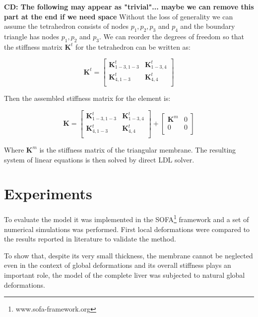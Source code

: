 \documentclass{llncs}
\newcommand{\CD}[1]{{\color{green}\textbf{CD: #1}}}
\newcommand{\Mat}[1]{\mathbf{#1}}
\begin{document}
\CD{The following may appear as "trivial"... maybe we can remove this part at the end if we need space} 
Without the loss of generality we can assume the tetrahedron consists of
nodes $p_1, p_2, p_3$ and $p_4$ and the boundary triangle has nodes $p_1, p_2$
and $p_3$. We can reorder the degrees of freedom so that the stiffness
matrix $\Mat{K}^t$ for the tetrahedron can be written as:

\begin{equation}
  \Mat{K}^t = \left[\begin{array}{c|c}
      \Mat{K}^t_{1-3,1-3} & \Mat{K}^t_{1-3,4} \\
      \hline
      \Mat{K}^t_{4,1-3} & \Mat{K}^t_{4,4} \\
  \end{array}\right]
\end{equation}

Then the assembled stiffness matrix for the element is:

\begin{equation}
  \Mat{K} = \left[\begin{array}{c|c}
      \Mat{K}^t_{1-3,1-3} & \Mat{K}^t_{1-3,4} \\
      \hline
      \Mat{K}^t_{4,1-3} & \Mat{K}^t_{4,4} \\
  \end{array}\right]
  +
  \left[\begin{array}{c|c}
      \Mat{K}^m & 0 \\
      \hline
      0 & 0 \\
  \end{array}\right]
\end{equation}

Where $\Mat{K}^m$ is the stiffness matrix of the triangular membrane.
The resulting
system of linear equations is then solved by direct LDL solver.




\section{Experiments} %
To evaluate the model it was implemented in the
SOFA\footnote{www.sofa-framework.org} framework and a set of
numerical simulations was performed. First local deformations were compared to the
results reported in literature to validate the method.

To show that, despite its very small thickness, the membrane cannot be
neglected even in the context of global deformations and its overall
stiffness plays an important role, the model of
the complete liver was subjected to natural global deformations.
\end{document}
